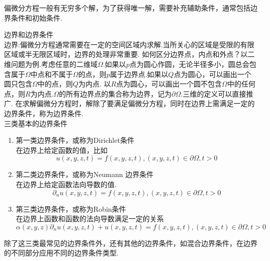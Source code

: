 	偏微分方程一般有无穷多个解，为了获得唯一解，需要补充辅助条件，通常包括边界条件和初始条件.
	\begin{mydef}
		边界和边界条件\\
		边界:偏微分方程通常需要在一定的空间区域内求解.当所关心的区域是受限的有限区域或半无限区域时，边界的处理非常重要. 如何区分边界点，内点和外点？以二维问题为例.考虑任意的二维域$\Omega$.如果以$p$点为圆心作圆，无论半径多小，圆总会包含属于$\Omega$中点和不属于$\Omega$的点，则$p$属于边界点.如果以$Q$点为圆心，可以画出一个圆只包含$\Omega$中的点，则$Q$为内点. 以$R$点为圆心，可以画出一个圆不包含$\Omega$中的任何点，则$R$为内点.$\Omega$的所有边界点的集合称为边界，记为$\partial \Omega$.三维的定义可以直接推广.
		在求解偏微分方程时，解除了要满足偏微分方程，同时在边界上需满足一定的边界条件，称为边界条件.\\
		三类基本的边界条件
		\begin{enumerate}[(1)]
			\item 第一类边界条件，或称为Dirichlet条件\\
				在边界上给定函数的值，比如
				\begin{equation*}
					u(x,y,z,t)=f(x,y,z,t), (x,y,z,t)\in \partial \Omega, t>0
				\end{equation*}
			\item 第二类边界条件，或称为Neumann 边界条件\\
				在边界上给定函数法向导数的值.
				\begin{equation*}
				\partial_n u(x,y,z,t)=f(x,y,z,t), (x,y,z,t)\in \partial \Omega, t>0
				\end{equation*}
			\item 第三类边界条件，或称为Robin条件\\
			 在边界上函数和函数的法向导数满足一定的关系
			 \begin{equation*}
			 	\alpha(x,y,z) \partial_n u(x,y,z,t) + u(x,y,z,t) =f(x,y,z,t), (x,y,z,t)\in \partial \Omega, t>0
			 \end{equation*}
			 
		\end{enumerate}
	除了这三类最常见的边界条件外，还有其他的边界条件，如混合边界条件，在边界的不同部分应用不同的边界条件类型.
	\end{mydef}

